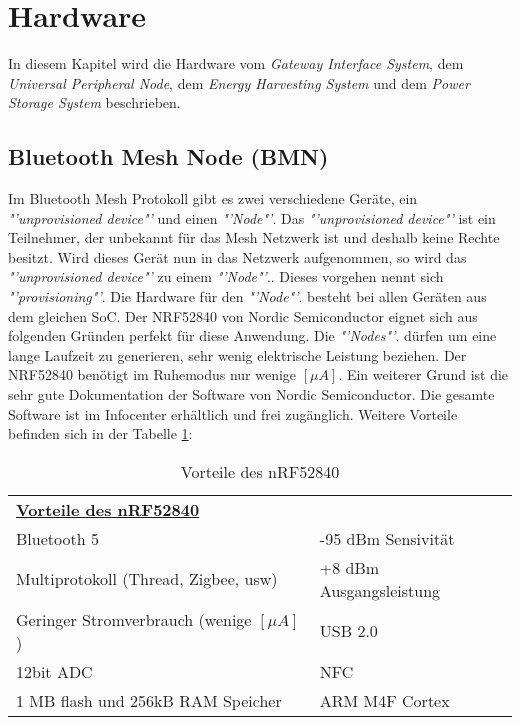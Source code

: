 \clearpage
\section{Hardware}\label{sec:Hardware}
In diesem Kapitel wird die Hardware vom \textit{Gateway Interface System}, dem \textit{Universal Peripheral Node}, dem \textit{Energy Harvesting System} und dem \textit{Power Storage System} beschrieben. 


\subsection{Bluetooth Mesh Node (BMN)}\label{subsec:BMN}
Im Bluetooth Mesh Protokoll gibt es zwei verschiedene  Geräte, ein \textit{"'unprovisioned device"'} und einen \textit{"'Node"'}. Das \textit{"'unprovisioned device"'}  ist ein Teilnehmer, der unbekannt für das Mesh Netzwerk ist und deshalb keine Rechte besitzt. Wird dieses Gerät nun in das Netzwerk aufgenommen, so wird das \textit{"'unprovisioned device"'}  zu einem \textit{"'Node"'}.. Dieses vorgehen nennt sich \textit{"'provisioning"'}. Die Hardware für den \textit{"'Node"'}. besteht bei allen Geräten aus dem gleichen SoC. Der NRF52840 von Nordic Semiconductor eignet sich aus folgenden Gründen perfekt für diese Anwendung. Die \textit{"'Nodes"'}. dürfen um eine lange Laufzeit zu generieren, sehr wenig elektrische Leistung beziehen. Der NRF52840 benötigt im Ruhemodus nur wenige $[\mu A]$. Ein weiterer Grund ist die sehr gute Dokumentation der Software von Nordic Semiconductor. Die gesamte Software ist im Infocenter erhältlich und frei zugänglich. Weitere Vorteile befinden sich in der Tabelle \ref{tbl:Vorteilte_nRF52}:\\


\begin{table}[h]
	\begin{tabular}{ll}
		\multicolumn{2}{l}{{\ul \textbf{Vorteile des nRF52840}}}       \\
		Bluetooth 5                          											   & -95 dBm Sensivität      \\
		Multiprotokoll (Thread, Zigbee, usw) 						   & +8 dBm Ausgangsleistung \\
		Geringer Stromverbrauch  (wenige $[\mu A]$)      	& USB 2.0                 \\
		12bit ADC                            												& NFC                     \\
		1 MB flash und 256kB RAM Speicher    						& ARM M4F Cortex         
	\end{tabular}
	\caption{Vorteile des nRF52840}
	\label{tbl:Vorteilte_nRF52}
\end{table}



